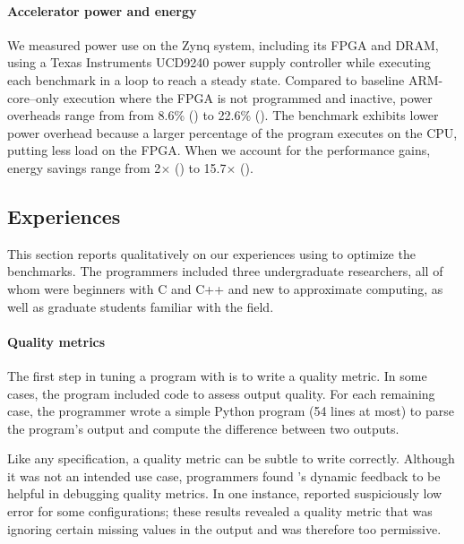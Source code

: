 \paragraph{Accelerator power and energy}
We measured power use on the Zynq system, including its FPGA and DRAM,
using a Texas Instruments UCD9240 power supply controller while executing each
benchmark in a loop to reach a steady state.
Compared to baseline ARM-core--only execution where the FPGA is
not programmed and inactive, power overheads range from
from 8.6\% ()
to 22.6\% ().
The  benchmark exhibits
lower power overhead because a larger percentage
of the program executes on the CPU, putting less load on the FPGA.
When we account for the performance gains, energy savings range from 2$\times$ () to 15.7$\times$ ().



\subsection{Experiences}
\label{accept:sec:casestudy}

This section
reports qualitatively on our experiences using \sysname to optimize the benchmarks.
The programmers included three undergraduate researchers, all of whom were
beginners with C and C++ and new to approximate computing,
as well as graduate students familiar with the field.


\paragraph{Quality metrics}
The first step in tuning a program with \sysname is to write a quality metric.
In some cases, the program included code to assess output quality.
For each remaining
case, the programmer wrote a simple Python program (54 lines at most) to parse the
program's output and compute the difference between two outputs.

Like any specification, a quality metric can be subtle to write correctly.
Although it was not an intended use case, programmers found \sysname's dynamic feedback to be helpful in debugging quality metrics.
In one instance, \sysname reported suspiciously low error for some
configurations; these results revealed a quality metric that was ignoring
certain missing values in the output and was therefore too permissive.


